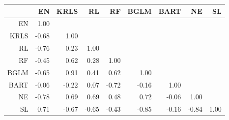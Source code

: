 \begin{table}[ht]
\centering
\begin{tabular}{rrrrrrrrr}
  \hline
 & EN & KRLS & RL & RF & BGLM & BART & NE & SL \\ 
  \hline
EN & 1.00 &  &  &  &  &  &  &  \\ 
  KRLS & -0.68 & 1.00 &  &  &  &  &  &  \\ 
  RL & -0.76 & 0.23 & 1.00 &  &  &  &  &  \\ 
  RF & -0.45 & 0.62 & 0.28 & 1.00 &  &  &  &  \\ 
  BGLM & -0.65 & 0.91 & 0.41 & 0.62 & 1.00 &  &  &  \\ 
  BART & -0.06 & -0.22 & 0.07 & -0.72 & -0.16 & 1.00 &  &  \\ 
  NE & -0.78 & 0.69 & 0.69 & 0.48 & 0.72 & -0.06 & 1.00 &  \\ 
  SL & 0.71 & -0.67 & -0.65 & -0.43 & -0.85 & -0.16 & -0.84 & 1.00 \\ 
   \hline
\end{tabular}
\end{table}
